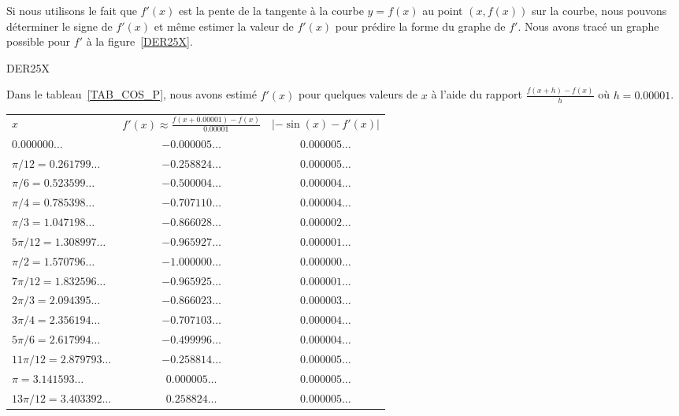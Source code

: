{Si nous utilisons le fait que $f'(x)$ est la pente de la tangente à la
courbe $y=f(x)$ au point $(x,f(x))$ sur la courbe, nous pouvons déterminer
le signe de $f'(x)$ et même estimer la valeur de $f'(x)$ pour prédire
la forme du graphe de $f'$.  Nous avons tracé un graphe possible pour $f'$ à
la figure~\ref{DER25X}.

{DER25X}

Dans le tableau~\ref{TAB_COS_P}, nous avons estimé $f'(x)$ pour quelques
valeurs de $x$ à l'aide du rapport $\displaystyle \frac{f(x+h)-f(x)}{h}$ où
$h = 0.00001$.

\begin{table}
{\scriptsize
\begin{center}
\begin{tabular}{l|c|c}
\cline{1-3}
\rule[-0.7em]{0ex}{2.5em} $x$
& $\displaystyle f'(x) \approx \frac{f(x+0.00001)-f(x)}{0.00001}$
& $|-\sin(x)-f'(x)|$ \\[0.8em]
\cline{1-3}
$0.000000\ldots$ & $-0.000005\ldots$ & $0.000005\ldots$ \\ 
$\pi/12 = 0.261799\ldots$ & $-0.258824\ldots$ & $0.000005\ldots$ \\ 
$\pi/6 = 0.523599\ldots$ & $-0.500004\ldots$ & $0.000004\ldots$ \\ 
$\pi/4 = 0.785398\ldots$ & $-0.707110\ldots$ & $0.000004\ldots$ \\ 
$\pi/3 = 1.047198\ldots$ & $-0.866028\ldots$ & $0.000002\ldots$ \\ 
$5\pi/12 = 1.308997\ldots$ & $-0.965927\ldots$ & $0.000001\ldots$ \\ 
$\pi/2 = 1.570796\ldots$ & $-1.000000\ldots$ & $0.000000\ldots$ \\ 
$7\pi/12 = 1.832596\ldots$ & $-0.965925\ldots$ & $0.000001\ldots$ \\ 
$2\pi/3 = 2.094395\ldots$ & $-0.866023\ldots$ & $0.000003\ldots$ \\ 
$3\pi/4 = 2.356194\ldots$ & $-0.707103\ldots$ & $0.000004\ldots$ \\ 
$5\pi/6 = 2.617994\ldots$ & $-0.499996\ldots$ & $0.000004\ldots$ \\ 
$11\pi/12 = 2.879793\ldots$ & $-0.258814\ldots$ & $0.000005\ldots$ \\ 
$\pi = 3.141593\ldots$ & $0.000005\ldots$ & $0.000005\ldots$ \\ 
$13\pi/12 = 3.403392\ldots$ & $0.258824\ldots$ & $0.000005\ldots$ \\ 

\end{tabular}
\end{center}}
\end{table}}
